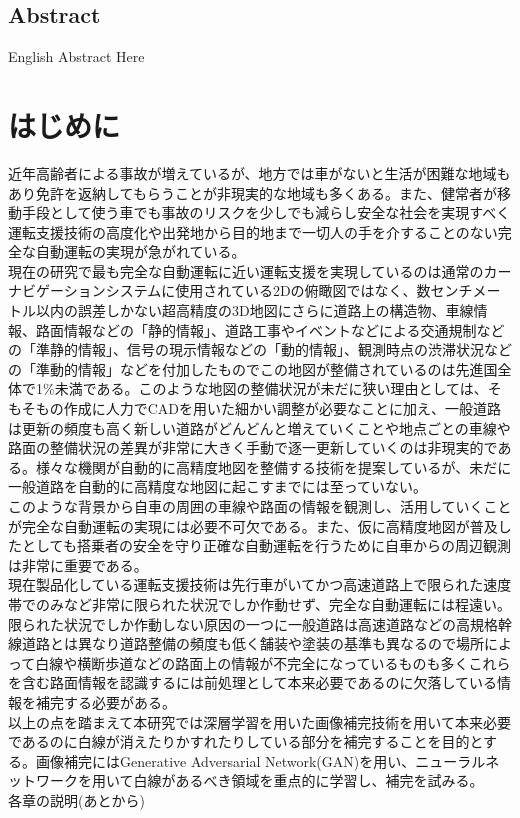 \documentclass[a4j, 11pt]{jreport}
\begin{document}
\section*{Abstract}
English Abstract Here


\newpage
\tableofcontents       %
\thispagestyle{empty}  %
\pagebreak
{} %


\chapter{はじめに}
近年高齢者による事故が増えているが、地方では車がないと生活が困難な地域もあり免許を返納してもらうことが非現実的な地域も多くある。また、健常者が移動手段として使う車でも事故のリスクを少しでも減らし安全な社会を実現すべく運転支援技術の高度化や出発地から目的地まで一切人の手を介することのない完全な自動運転の実現が急がれている。\\
\indent 現在の研究で最も完全な自動運転に近い運転支援を実現しているのは通常のカーナビゲーションシステムに使用されている2Dの俯瞰図ではなく、数センチメートル以内の誤差しかない超高精度の3D地図にさらに道路上の構造物、車線情報、路面情報などの「静的情報」、道路工事やイベントなどによる交通規制などの「準静的情報」、信号の現示情報などの「動的情報」、観測時点の渋滞状況などの「準動的情報」などを付加したものでこの地図が整備されているのは先進国全体で1\%未満である。このような地図の整備状況が未だに狭い理由としては、そもそもの作成に人力でCADを用いた細かい調整が必要なことに加え、一般道路は更新の頻度も高く新しい道路がどんどんと増えていくことや地点ごとの車線や路面の整備状況の差異が非常に大きく手動で逐一更新していくのは非現実的である。様々な機関が自動的に高精度地図を整備する技術を提案しているが、未だに一般道路を自動的に高精度な地図に起こすまでには至っていない。\cite{tri-ad}\cite{autolab}\\
\indent このような背景から自車の周囲の車線や路面の情報を観測し、活用していくことが完全な自動運転の実現には必要不可欠である。また、仮に高精度地図が普及したとしても搭乗者の安全を守り正確な自動運転を行うために自車からの周辺観測は非常に重要である。\\
\indent 現在製品化している運転支援技術は先行車がいてかつ高速道路上で限られた速度帯でのみなど非常に限られた状況でしか作動せず、完全な自動運転には程遠い。限られた状況でしか作動しない原因の一つに一般道路は高速道路などの高規格幹線道路とは異なり道路整備の頻度も低く舗装や塗装の基準も異なるので場所によって白線や横断歩道などの路面上の情報が不完全になっているものも多くこれらを含む路面情報を認識するには前処理として本来必要であるのに欠落している情報を補完する必要がある。\cite{road_design}\\
\indent 以上の点を踏まえて本研究では深層学習を用いた画像補完技術を用いて本来必要であるのに白線が消えたりかすれたりしている部分を補完することを目的とする。画像補完にはGenerative Adversarial Network(GAN)を用い、ニューラルネットワークを用いて白線があるべき領域を重点的に学習し、補完を試みる。\\
\indent 各章の説明(あとから)
\end{document}
